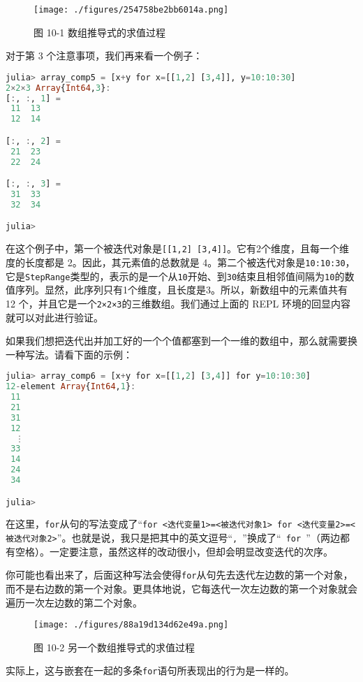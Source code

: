 \begin{figure}[ht]
\centering
\texttt{[image: ./figures/254758be2bb6014a.png]}
\caption{图 10-1 数组推导式的求值过程} \label{fig_JuCAS6_1}
\end{figure}

对于第 3 个注意事项，我们再来看一个例子：

\begin{lstlisting}[language=julia]
julia> array_comp5 = [x+y for x=[[1,2] [3,4]], y=10:10:30]
2×2×3 Array{Int64,3}:
[:, :, 1] =
 11  13
 12  14

[:, :, 2] =
 21  23
 22  24

[:, :, 3] =
 31  33
 32  34

julia> 
\end{lstlisting}

在这个例子中，第一个被迭代对象是\verb|[[1,2] [3,4]]|。它有2个维度，且每一个维度的长度都是 2。因此，其元素值的总数就是 4。第二个被迭代对象是\verb|10:10:30|，它是\verb|StepRange|类型的，表示的是一个从\verb|10|开始、到\verb|30|结束且相邻值间隔为\verb|10|的数值序列。显然，此序列只有1个维度，且长度是3。所以，新数组中的元素值共有 12 个，并且它是一个\verb|2×2×3|的三维数组。我们通过上面的 REPL 环境的回显内容就可以对此进行验证。

如果我们想把迭代出并加工好的一个个值都塞到一个一维的数组中，那么就需要换一种写法。请看下面的示例：

\begin{lstlisting}[language=julia]
julia> array_comp6 = [x+y for x=[[1,2] [3,4]] for y=10:10:30]
12-element Array{Int64,1}:
 11
 21
 31
 12
  ⋮
 33
 14
 24
 34

julia> 
\end{lstlisting}

在这里，\verb|for|从句的写法变成了“\verb|for <迭代变量1>=<被迭代对象1> for <迭代变量2>=<被迭代对象2>|”。也就是说，我只是把其中的英文逗号“\verb|, |”换成了“\verb| for |”（两边都有空格）。一定要注意，虽然这样的改动很小，但却会明显改变迭代的次序。

你可能也看出来了，后面这种写法会使得\verb|for|从句先去迭代左边数的第一个对象，而不是右边数的第一个对象。更具体地说，它每迭代一次左边数的第一个对象就会遍历一次左边数的第二个对象。

\begin{figure}[ht]
\centering
\texttt{[image: ./figures/88a19d134d62e49a.png]}
\caption{图 10-2 另一个数组推导式的求值过程} \label{fig_JuCAS6_2}
\end{figure}

实际上，这与嵌套在一起的多条\verb|for|语句所表现出的行为是一样的。

